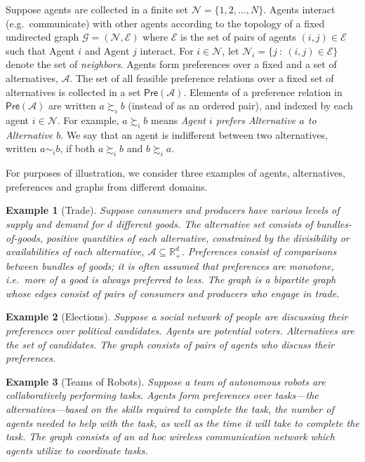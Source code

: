 \documentclass[conference]{ieeeconf}
\newcommand{\R}{\mathbb{R}}
\newcommand{\N}{\mathcal{N}}
\newcommand{\A}{\mathcal{A}}
\renewcommand{\SS}{\mathcal{S}}
\newcommand{\E}{\mathcal{E}}
\newcommand{\Pref}{\mathsf{Pre}}
\newcommand{\prefers}{\succsim}
\newcommand{\indif}{\sim}
\newcommand{\graph}{\mathcal{G}}
\newcommand{\Act}{\mathcal{A}ct}
\newtheorem{example}{Example}
\begin{document}
Suppose agents are collected in a finite set $\N = \{1,2,\dots,N\}$. Agents interact (e.g.~communicate) with other agents according to the topology of a fixed undirected graph $\graph = (\N,\E)$ where $\E$ is the set of pairs of agents $(i,j) \in \E$ such that Agent $i$ and Agent $j$ interact. For $i \in \N$, let $\N_i = \{ j~:~(i,j) \in \E\}$ denote the set of \emph{neighbors}. Agents form preferences over a fixed and a set of alternatives, $\A$. The set of all feasible preference relations over a fixed set of alternatives is collected in a set $\Pref(\A)$. Elements of a preference relation in $\Pref(\A)$ are written $a \prefers_i b$ (instead of as an ordered pair), and indexed by each agent $i \in \N$. For example, $a \prefers_i b$ means \emph{Agent $i$ prefers Alternative $a$ to Alternative $b$}. We say that an agent is indifferent between two alternatives, written $a \indif_i b$, if both $a \prefers_i b$ and $b \prefers_i a$.

For purposes of illustration, we consider three examples of agents, alternatives, preferences and graphs from different domains.

\begin{example}[Trade]
    Suppose consumers and producers have various levels of supply and demand for $d$ different goods. The alternative set consists of  bundles-of-goods, positive quantities of each alternative, constrained by the divisibility or availabilities of each alternative, $\A \subseteq \R^{d}_{+}$. Preferences consist of comparisons between bundles of goods; it is often assumed that preferences are monotone, i.e.~more of a good is always preferred to less. The graph is a bipartite graph whose edges consist of pairs of consumers and producers who engage in trade.
\end{example}
\begin{example}[Elections]
    Suppose a social network of people are discussing their preferences over political candidates. Agents are potential voters. Alternatives are the set of candidates. The graph consists of pairs of agents who discuss their preferences.
\end{example}
\begin{example}[Teams of Robots]
    Suppose a team of autonomous robots are collaboratively performing tasks. Agents form preferences over tasks---the alternatives---based on the skills required to complete the task, the number of agents needed to help with the task, as well as the time it will take to complete the task. The graph consists of an \emph{ad hoc} wireless communication network which agents utilize to coordinate tasks.
\end{example}
\end{document}
